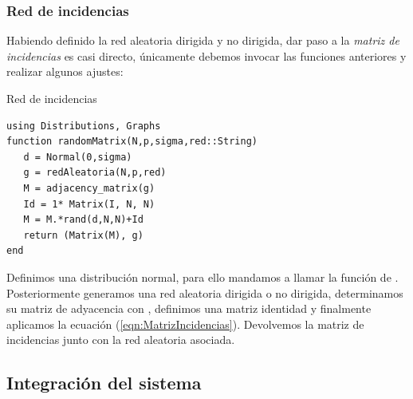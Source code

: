\subsubsection{Red de incidencias}\label{sec:redIncidencias}

Habiendo definido la red aleatoria dirigida y no dirigida, dar paso a la \textit{matriz de incidencias} es casi directo, únicamente debemos invocar las funciones anteriores y realizar algunos ajustes:
\begin{algorithm}
	\label{al:redIncidencias}
	\caption{Red de incidencias}
	\begin{verbatim}
using Distributions, Graphs
function randomMatrix(N,p,sigma,red::String)
   d = Normal(0,sigma)
   g = redAleatoria(N,p,red)
   M = adjacency_matrix(g)
   Id = 1* Matrix(I, N, N)
   M = M.*rand(d,N,N)+Id
   return (Matrix(M), g)
end
	\end{verbatim}
\end{algorithm}

Definimos una distribución normal, para ello mandamos a llamar la función  de . Posteriormente generamos una red aleatoria dirigida o no dirigida, determinamos su matriz de adyacencia con , definimos una matriz identidad  y finalmente aplicamos la ecuación (\ref{eqn:MatrizIncidencias}). Devolvemos la matriz de incidencias junto con la red aleatoria asociada.

\subsection{Integración del sistema}\label{sec:poblacionesLK}

